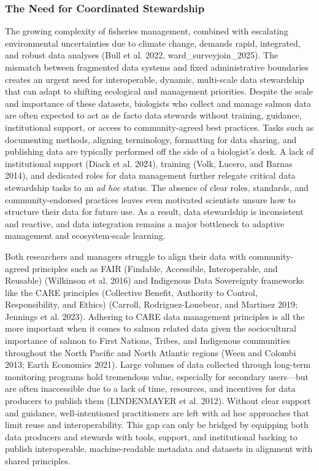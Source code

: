 \documentclass[
  letterpaper,
  DIV=11,
  numbers=noendperiod]{scrartcl}
\begin{document}
\subsubsection{The Need for Coordinated
Stewardship}\label{the-need-for-coordinated-stewardship}

The growing complexity of fisheries management, combined with escalating
environmental uncertainties due to climate change, demands rapid,
integrated, and robust data analyses (Bull et al. 2022,
ward\_surveyjoin\_2025). The mismatch between fragmented data systems
and fixed administrative boundaries creates an urgent need for
interoperable, dynamic, multi-scale data stewardship that can adapt to
shifting ecological and management priorities. Despite the scale and
importance of these datasets, biologists who collect and manage salmon
data are often expected to act as de facto data stewards without
training, guidance, institutional support, or access to community-agreed
best practices. Tasks such as documenting methods, aligning terminology,
formatting for data sharing, and publishing data are typically performed
off the side of a biologist's desk. A lack of institutional support
(Diack et al. 2024), training (Volk, Lucero, and Barnas 2014), and
dedicated roles for data management further relegate critical data
stewardship tasks to an \emph{ad hoc} status. The absence of clear
roles, standards, and community-endorsed practices leaves even motivated
scientists unsure how to structure their data for future use. As a
result, data stewardship is inconsistent and reactive, and data
integration remains a major bottleneck to adaptive management and
ecosystem-scale learning.

Both researchers and managers struggle to align their data with
community-agreed principles such as FAIR (Findable, Accessible,
Interoperable, and Reusable) (Wilkinson et al. 2016) and Indigenous Data
Sovereignty frameworks like the CARE principles (Collective Benefit,
Authority to Control, Responsibility, and Ethics) (Carroll,
Rodriguez-Lonebear, and Martinez 2019; Jennings et al. 2023). Adhering
to CARE data management principles is all the more important when it
comes to salmon related data given the sociocultural importance of
salmon to First Nations, Tribes, and Indigenous communities throughout
the North Pacific and North Atlantic regions (Ween and Colombi 2013;
Earth Economics 2021). Large volumes of data collected through long-term
monitoring programs hold tremendous value, especially for secondary
users---but are often inaccessible due to a lack of time, resources, and
incentives for data producers to publish them (LINDENMAYER et al. 2012).
Without clear support and guidance, well-intentioned practitioners are
left with ad hoc approaches that limit reuse and interoperability. This
gap can only be bridged by equipping both data producers and stewards
with tools, support, and institutional backing to publish interoperable,
machine-readable metadata and datasets in alignment with shared
principles.
\end{document}
